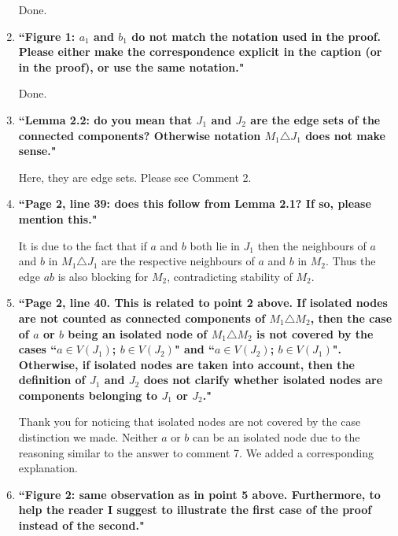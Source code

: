 \documentclass[11pt]{article}
\begin{document}
\begin{enumerate}
		
	\smallskip
	
	Done.
	
	\bigskip
	
	\item \textbf{``Figure 1: $a_1$ and $b_1$ do not match the notation used in the proof. Please either make
the correspondence explicit in the caption (or in the proof), or use the same notation."}
	
	\smallskip
	
	Done.
	
	\bigskip
	
	\item \textbf{``Lemma 2.2: do you mean that $J_1$ and $J_2$ are the edge sets of the connected components? Otherwise notation $M_1\triangle J_1$ does not make sense."}
	
	\smallskip
	
	Here, they are edge sets. Please see Comment 2.
	
	\bigskip
	
	\item \textbf{``Page 2, line 39: does this follow from Lemma 2.1? If so, please mention this."}
	
	\smallskip
	
	It is due to the fact that if $a$ and $b$ both lie in $J_1$ then the neighbours of $a$ and $b$ in $M_1\triangle J_1$ are the respective neighbours of $a$ and $b$ in $M_2$. Thus the edge $ab$ is also blocking for $M_2$, contradicting stability of $M_2$.
	
	\bigskip
	
		
	\item \textbf{``Page 2, line 40. This is related to point 2 above. If isolated nodes are not counted as
connected components of $M_1\triangle M_2$, then the case of $a$ or $b$ being an isolated node of
$M_1\triangle M_2$ is not covered by the cases ``$a \in V (J_1)$; $b \in V (J_2)$" and ``$a \in V (J_2)$; $b \in V (J_1)$". Otherwise, if isolated nodes are taken into account, then the definition of $J_1$ and $J_2$ does
not clarify whether isolated nodes are components belonging to $J_1$ or $J_2$."}
	
	\smallskip
	
	Thank you for noticing that isolated nodes are not covered by the case distinction we made. Neither $a$ or $b$ can be an isolated node due to the reasoning similar to the answer to comment 7. We added a corresponding explanation.
	
	\bigskip

	\item \textbf{``Figure 2: same observation as in point 5 above. Furthermore, to help the reader I
suggest to illustrate the first case of the proof instead of the second."}
	

\end{enumerate}
\end{document}
